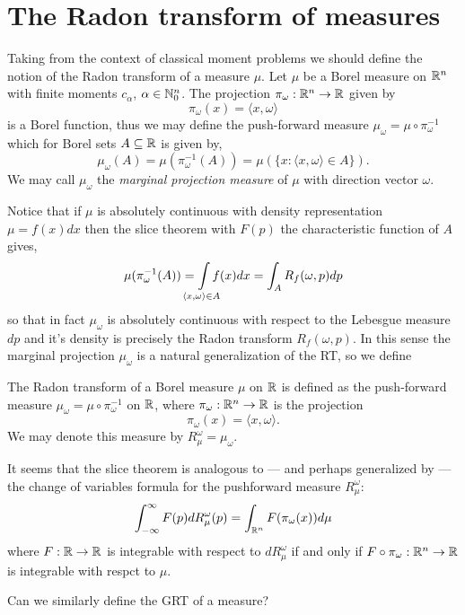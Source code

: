 
\section{The Radon transform of measures}


Taking from the context of classical moment problems we should define the notion of the Radon transform of a measure $\mu$. Let $\mu$ be a Borel measure on $\mathbb{R}^n$ with finite moments $c_\alpha$, $\alpha \in \mathbb{N}_0^n$. The projection $\pi_\omega : \mathbb{R}^n \rightarrow \mathbb{R}$ given by
\[
  \pi_\omega(x) = \langle x, \omega \rangle
\] 
is a Borel function, thus we may define the push-forward measure $\mu_\omega = \mu \circ \pi_\omega^{-1}$ which for Borel sets $A \subseteq \mathbb{R}$ is given by,
\[
  \mu_\omega(A) = \mu(\pi_\omega^{-1}(A)) = \mu(\{x : \langle x, \omega \rangle \in A\}).
\]
We may call $\mu_\omega$ the \emph{marginal projection measure} of $\mu$ with direction vector $\omega$.

Notice that if $\mu$ is absolutely continuous with density representation $\mu = f(x)dx$ then the slice theorem with $F(p)$ the characteristic function of $A$ gives,
\[
  \mu(\pi_\omega^{-1}(A)) = \int\mclimits_{\langle x, \omega \rangle \in A} f(x)dx = \int_A R_f(\omega, p) dp
\]
so that in fact $\mu_\omega$ is absolutely continuous with respect to the Lebesgue measure $dp$ and it's density is precisely the Radon transform $R_f(\omega, p)$. In this sense the marginal projection $\mu_\omega$ is a natural generalization of the RT, so we define

\begin{definition}
  The Radon transform of a Borel measure $\mu$ on $\mathbb{R}$ is defined as the push-forward measure $\mu_\omega = \mu \circ \pi_\omega^{-1}$ on $\mathbb{R}$, where $\pi_\omega: \mathbb{R}^n \rightarrow \mathbb{R}$ is the projection 
  \[
    \pi_\omega(x) = \langle x, \omega \rangle.
  \]
  We may denote this measure by $R_\mu^\omega = \mu_\omega$.
\end{definition}

\begin{remark}
  It seems that the slice theorem is analogous to — and perhaps generalized by — the change of variables formula for the pushforward measure $R^\omega_\mu$:
  \[
    \int_{-\infty}^\infty F(p) dR^\omega_\mu(p) = \int_{\mathbb{R}^n} F(\pi_\omega(x)) d\mu
  \]
  where $F:\mathbb{R} \rightarrow \mathbb{R}$ is integrable with respect to $dR^\omega_\mu$ if and only if $F\circ\pi_\omega : \mathbb{R}^n \rightarrow \mathbb{R}$ is integrable with respct to $\mu$.
\end{remark}
Can we similarly define the GRT of a measure?

